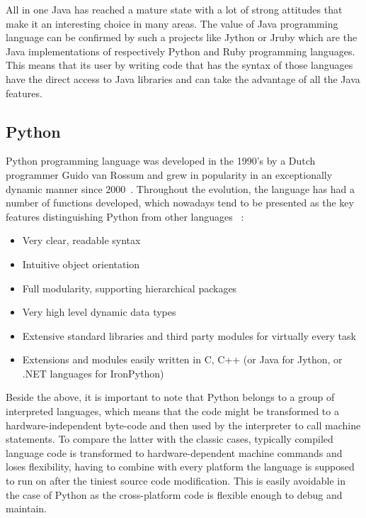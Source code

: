 All in one Java has reached a mature state with a lot of strong attitudes that make it an interesting choice in many areas. The value of Java programming language can be confirmed by such a projects like Jython or Jruby which are the Java implementations of respectively Python and Ruby programming languages. This means that its user by writing code that has the syntax of those languages have the direct access to Java libraries and can take the advantage of all the Java features.  

\subsection{Python}\label{subsec:py}
Python programming language was developed in the 1990's by a Dutch programmer Guido van Rossum and grew in popularity in an exceptionally dynamic manner since 2000~\cite{py_code_swarm}. Throughout the evolution, the language has had a number of functions developed, which nowadays tend to be presented as the key features distinguishing Python from other languages ~\cite{py_about}:
\begin{itemize}
\item{Very clear, readable syntax}
\item{Intuitive object orientation}
\item{Full modularity, supporting hierarchical packages}
\item{Very high level dynamic data types}
\item{Extensive standard libraries and third party modules for virtually every task}
\item{Extensions and modules easily written in C, C++ (or Java for Jython, or .NET languages for IronPython)}
\end{itemize}
Beside the above, it is important to note that Python belongs to a group of interpreted languages, which means that the code might be transformed to a hardware-independent byte-code and then used by the interpreter to call machine statements. To compare the latter with the classic cases, typically compiled language code is transformed to hardware-dependent machine commands and loses flexibility, having to combine with every platform the language is supposed to run on after the tiniest source code modification. This is easily avoidable in the case of Python as the cross-platform code is flexible enough to debug and maintain. 

